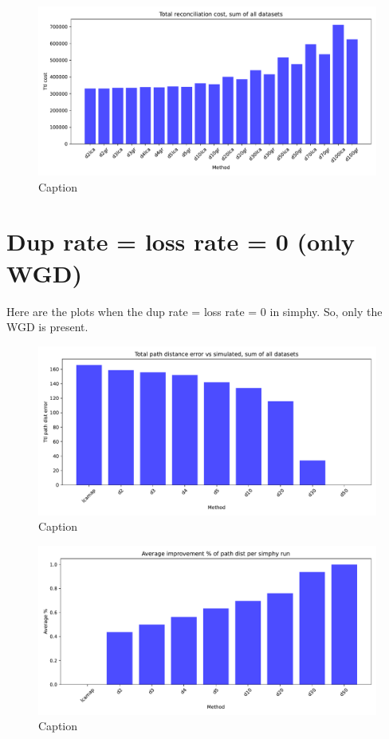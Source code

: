 \documentclass{article}
\begin{document}
\begin{figure}
    \centering
    \includegraphics[width=\textwidth]{plots/costs_loss.pdf}
    \caption{Caption}
    \label{fig:enter-label}
\end{figure}


\clearpage

\section*{Dup rate = loss rate = 0 (only WGD)}

Here are the plots when the dup rate = loss rate = 0 in simphy.  So, only the WGD is present.

\begin{figure}[H]
    \centering
    \includegraphics[width=\textwidth]{plots/dists_duprate0.pdf}
    \caption{Caption}
    \label{fig:enter-label}
\end{figure}


\begin{figure}
    \centering
    \includegraphics[width=\textwidth]{plots/avgpctimprov_duprate0.pdf}
    \caption{Caption}
    \label{fig:enter-label}
\end{figure}
\end{document}
